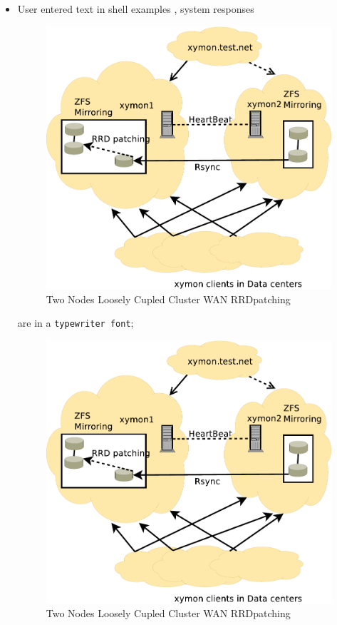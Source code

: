 \begin{itemize}
\item User entered text in shell examples \texttt{}, system responses
\begin{figure}[H]
\caption{Two Nodes Loosely Cupled Cluster WAN RRDpatching}
\label{fig:TwoNodeLooselyCpupledClusterWAN-RRDpatching7}
\begin{center}
\includegraphics[scale=0.65]{dia/TwoNodeLooselyCpupledClusterWAN-RRDpatching.pdf}
\end{center}
\end{figure}

are in a \texttt{typewriter font};
\begin{figure}[H]
\caption{Two Nodes Loosely Cupled Cluster WAN RRDpatching}
\label{fig:TwoNodeLooselyCpupledClusterWAN-RRDpatching8}
\begin{center}
\includegraphics[scale=0.65]{dia/TwoNodeLooselyCpupledClusterWAN-RRDpatching.pdf}
\end{center}
\end{figure}


\end{itemize}
